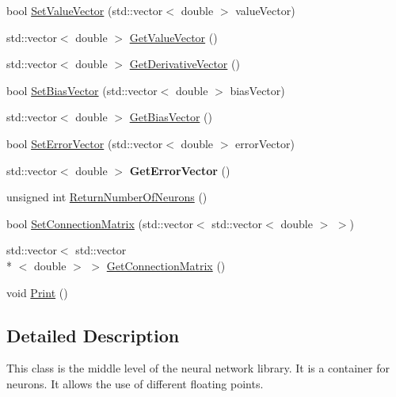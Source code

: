 \begin{DoxyCompactItemize}
\item 
bool \hyperlink{classneuroc_1_1_layer_a8e232dadedf86bfa7dafa106e97ade05}{Set\-Value\-Vector} (std\-::vector$<$ double $>$ value\-Vector)
\item 
std\-::vector$<$ double $>$ \hyperlink{classneuroc_1_1_layer_a14fd8d60709fbe79059574b090f9531a}{Get\-Value\-Vector} ()
\item 
std\-::vector$<$ double $>$ \hyperlink{classneuroc_1_1_layer_ab413f32620308964d8cc2ba480b460e2}{Get\-Derivative\-Vector} ()
\item 
bool \hyperlink{classneuroc_1_1_layer_ada5237f8e9211d3dc308fa2e083b2b44}{Set\-Bias\-Vector} (std\-::vector$<$ double $>$ bias\-Vector)
\item 
std\-::vector$<$ double $>$ \hyperlink{classneuroc_1_1_layer_aaa40443732765acc4ac8ea6a8441c471}{Get\-Bias\-Vector} ()
\item 
bool \hyperlink{classneuroc_1_1_layer_a8e60b80bc457e7f82dc24fffc94fb9f0}{Set\-Error\-Vector} (std\-::vector$<$ double $>$ error\-Vector)
\item 
\hypertarget{classneuroc_1_1_layer_a722af6edd652f0f5f099b30d459542e5}{std\-::vector$<$ double $>$ {\bfseries Get\-Error\-Vector} ()}\label{classneuroc_1_1_layer_a722af6edd652f0f5f099b30d459542e5}

\item 
unsigned int \hyperlink{classneuroc_1_1_layer_af2e9d4a30544bf754a06e0e2b98fe60f}{Return\-Number\-Of\-Neurons} ()
\item 
bool \hyperlink{classneuroc_1_1_layer_af78c06c9368bc4076d3031f5d78ae141}{Set\-Connection\-Matrix} (std\-::vector$<$ std\-::vector$<$ double $>$ $>$)
\item 
std\-::vector$<$ std\-::vector\\*
$<$ double $>$ $>$ \hyperlink{classneuroc_1_1_layer_ab8653bbed4c2b26ec18b00be1dde8000}{Get\-Connection\-Matrix} ()
\item 
void \hyperlink{classneuroc_1_1_layer_a30ffd9156bc08a96474d48a3ec661cd9}{Print} ()
\end{DoxyCompactItemize}


\subsection{Detailed Description}
This class is the middle level of the neural network library. It is a container for neurons. It allows the use of different floating points. 

